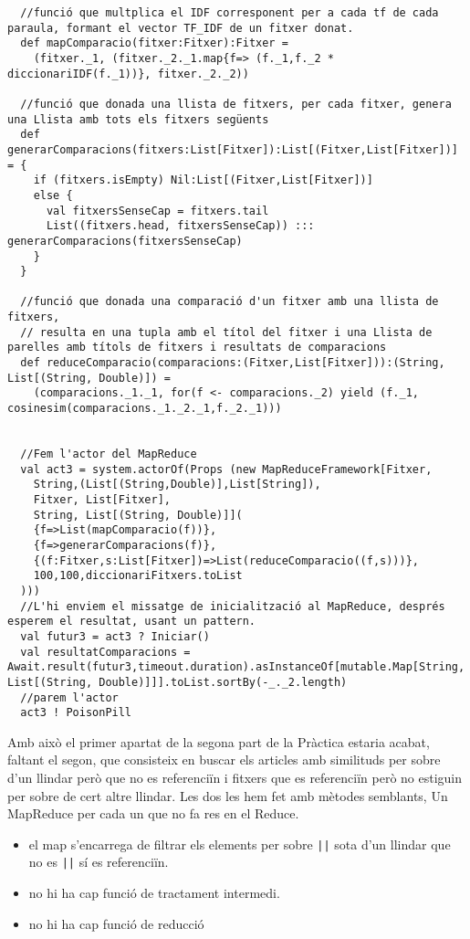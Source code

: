 \documentclass[11pt,a4paper,twoside]{report}
\begin{document}
\begin{lstlisting}
  //funció que multplica el IDF corresponent per a cada tf de cada paraula, formant el vector TF_IDF de un fitxer donat.
  def mapComparacio(fitxer:Fitxer):Fitxer =
    (fitxer._1, (fitxer._2._1.map{f=> (f._1,f._2 * diccionariIDF(f._1))}, fitxer._2._2))

  //funció que donada una llista de fitxers, per cada fitxer, genera una Llista amb tots els fitxers següents
  def generarComparacions(fitxers:List[Fitxer]):List[(Fitxer,List[Fitxer])] = {
    if (fitxers.isEmpty) Nil:List[(Fitxer,List[Fitxer])]
    else {
      val fitxersSenseCap = fitxers.tail
      List((fitxers.head, fitxersSenseCap)) ::: generarComparacions(fitxersSenseCap)
    }
  }

  //funció que donada una comparació d'un fitxer amb una llista de fitxers,
  // resulta en una tupla amb el títol del fitxer i una Llista de parelles amb títols de fitxers i resultats de comparacions
  def reduceComparacio(comparacions:(Fitxer,List[Fitxer])):(String, List[(String, Double)]) =
    (comparacions._1._1, for(f <- comparacions._2) yield (f._1, cosinesim(comparacions._1._2._1,f._2._1)))


  //Fem l'actor del MapReduce
  val act3 = system.actorOf(Props (new MapReduceFramework[Fitxer,
    String,(List[(String,Double)],List[String]),
    Fitxer, List[Fitxer],
    String, List[(String, Double)]](
    {f=>List(mapComparacio(f))},
    {f=>generarComparacions(f)},
    {(f:Fitxer,s:List[Fitxer])=>List(reduceComparacio((f,s)))},
    100,100,diccionariFitxers.toList
  )))
  //L'hi enviem el missatge de inicialització al MapReduce, després esperem el resultat, usant un pattern.
  val futur3 = act3 ? Iniciar()
  val resultatComparacions = Await.result(futur3,timeout.duration).asInstanceOf[mutable.Map[String, List[(String, Double)]]].toList.sortBy(-_._2.length)
  //parem l'actor
  act3 ! PoisonPill
\end{lstlisting}

Amb això el primer apartat de la segona part de la Pràctica estaria acabat, faltant el segon, que consisteix en buscar els articles amb similituds per sobre d'un llindar però que no es referenciïn
i fitxers que es referenciïn però no estiguin per sobre de cert altre llindar. Les dos les hem fet amb mètodes semblants, Un MapReduce per cada un que no fa res en el Reduce.
\begin{itemize}
  \item el map s'encarrega de filtrar els elements per {sobre \texttt{||} sota} d'un llindar que {no es \texttt{||} sí es} referenciïn.
  \item no hi ha cap funció de tractament intermedi.
  \item no hi ha cap funció de reducció
\end{itemize}
\end{document}
